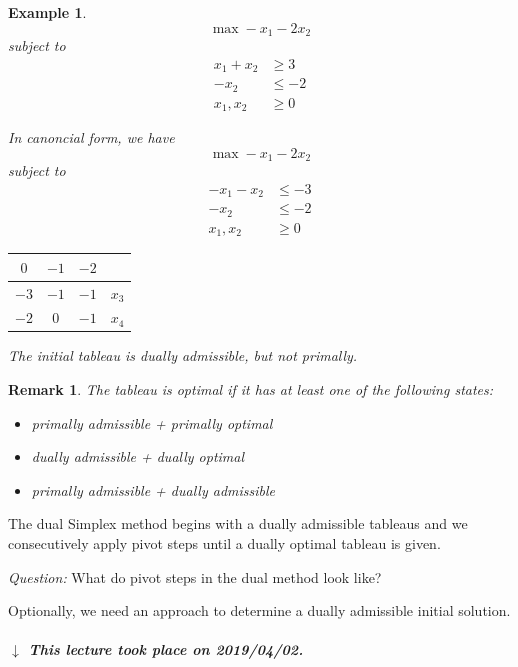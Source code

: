\documentclass[a4paper]{article}
\numberwithin{lecref}{subsection}
\newcounter{exercises}
\newtheorem{example}[exercises]{Example}
\newtheorem*{Remark}{Remark}
\newcommand{\dateref}[1]{%
  \begin{mdframed}[backgroundcolor=gray!10,innerbottommargin=0pt,innertopmargin=0pt]
    \paragraph{\textit{$\downarrow$ This lecture took place on #1.}}%
  \end{mdframed}%
}
\begin{document}
\begin{example}
	\[ \max -x_1 - 2x_2 \]
	subject to
	\begin{align*}
		x_1 + x_2 &\geq 3 \\
		-x_2 &\leq -2 \\
		x_1, x_2 &\geq 0
	\end{align*}

	In canoncial form, we have
	\[ \max -x_1 - 2x_2 \]
	subject to
	\begin{align*}
		-x_1 - x_2 & \leq -3 \\
		-x_2 & \leq -2 \\
		x_1, x_2 & \geq 0
	\end{align*}

	\begin{center}
		\begin{tabular}{c|ccr}
			$0$ & $-1$ & $-2$ & \\
		\hline
			$-3$ & $-1$ & $-1$ & $x_3$ \\
			$-2$ & $0$ & $-1$  & $x_4$
		\end{tabular}
	\end{center}
	The initial tableau is dually admissible, but not primally.
\end{example}

\begin{Remark}
	The tableau is optimal if it has at least one of the following states:
	\begin{itemize}
		\item primally admissible + primally optimal
		\item dually admissible + dually optimal
		\item primally admissible + dually admissible
	\end{itemize}
\end{Remark}

The dual Simplex method begins with a dually admissible tableaus and we consecutively apply pivot steps until a dually optimal tableau is given.

\emph{Question:} What do pivot steps in the dual method look like?

Optionally, we need an approach to determine a dually admissible initial solution.

\dateref{2019/04/02}
\end{document}
